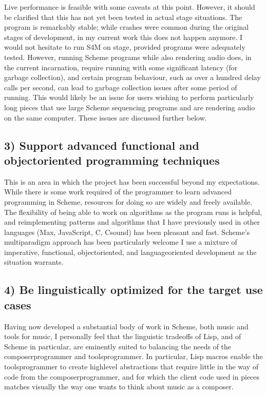 \documentclass[letterpaper,10pt,english]{sphinxmanual}
\begin{document}
\sphinxAtStartPar
Live performance is feasible with some caveats at this point. However, it should be
clarified that this has not yet been tested in actual stage situations.
The program is remarkably stable; while crashes were common
during the original stages of development, in my current work this
does not happen anymore. I would not hesitate to run S4M on stage,
provided programs were adequately tested.
However, running  Scheme programs while also rendering audio does, in the current incarnation,
require running with some significant latency (for garbage collection), and certain
program behaviour, such as over a hundred delay calls per second, can lead
to garbage collection issues after some period of running.
This would likely be an issue for users wishing to perform
particularly long pieces that use large Scheme sequencing programs and are
rendering audio on the same computer. These issues are discussed further
below.


\subsection{3) Support advanced functional and object\sphinxhyphen{}oriented programming techniques}
\label{\detokenize{conclusion:support-advanced-functional-and-object-oriented-programming-techniques}}
\sphinxAtStartPar
This is an area in which the project has been successful beyond my expectations.
While there is some work required of the programmer to learn advanced programming in Scheme,
resources for doing so are widely and freely available.
The flexibility of being able to work on algorithms as the program runs is helpful,
and reimplementing patterns and algorithms that I have previously used in other languages
(Max, JavaScript, C, Csound) has been pleasant and fast.
Scheme’s multi\sphinxhyphen{}paradigm approach has been particularly welcome \sphinxhyphen{} I use a mixture
of imperative, functional, object\sphinxhyphen{}oriented, and language\sphinxhyphen{}oriented development as the situation warrants.


\subsection{4) Be linguistically optimized for the target use cases}
\label{\detokenize{conclusion:be-linguistically-optimized-for-the-target-use-cases}}
\sphinxAtStartPar
Having now developed a substantial body of work in Scheme, both music and tools for music,
I personally feel that the linguistic tradeoffs of Lisp, and of Scheme in particular,
are eminently suited to balancing the needs of the composer\sphinxhyphen{}programmer and tools\sphinxhyphen{}programmer.
In particular, Lisp macros
enable the tools\sphinxhyphen{}programmer to create high\sphinxhyphen{}level abstractions that require
little in the way of code from the composer\sphinxhyphen{}programmer, and for which the client code
used in pieces matches visually the way one wants to think about music as a composer.
\end{document}
